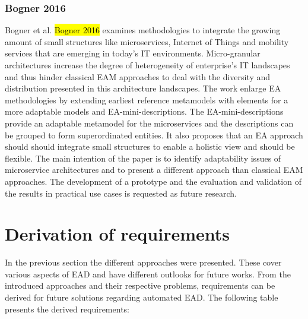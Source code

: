 \subsubsection{Bogner 2016}
Bogner et al. \hl{Bogner 2016} examines methodologies to integrate the growing amount of small structures like microservices, Internet of Things and mobility services that are emerging in today's IT environments. Micro-granular architectures increase the degree of heterogeneity of enterprise's IT landscapes and thus hinder classical EAM approaches to deal with the diversity and distribution presented in this architecture landscapes. The work enlarge EA methodologies by extending earliest reference metamodels with elements for a more adaptable models and EA-mini-descriptions. The EA-mini-descriptions provide an adaptable metamodel for the microservices and the descriptions can be grouped to form superordinated entities. It also proposes that an EA approach should should integrate small structures to enable a holistic view and should be flexible. The main intention of the paper is to identify adaptability issues of microservice architectures and to present a different approach than classical EAM approaches. The development of a prototype and the evaluation and validation of the results in practical use cases is requested as future research.

\section{Derivation of requirements}

In the previous section the different approaches were presented. These cover various aspects of EAD and have different outlooks for future works. From the introduced approaches and their respective problems, requirements can be derived for future solutions regarding automated EAD. The following table presents the derived requirements:

